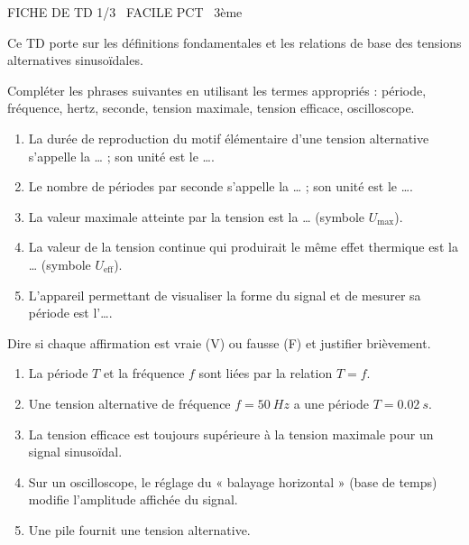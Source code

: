 \documentclass[11pt]{article}
\begin{document}
\begin{tcolorbox}[enhanced,colback=popink,colframe=popink,arc=10pt,boxrule=0pt,left=12pt,right=12pt,top=9pt,bottom=9pt]
{\color{white}\popxbold\small FICHE DE TD 1/3 \textbullet\ FACILE \hfill PCT \textbullet\ 3ème\par}
\end{tcolorbox}
\vspace{4pt}
Ce TD porte sur les définitions fondamentales et les relations de base des tensions alternatives sinusoïdales.

\begin{exercice}
Compléter les phrases suivantes en utilisant les termes appropriés : période, fréquence, hertz, seconde, tension maximale, tension efficace, oscilloscope.
\begin{enumerate}
    \item La durée de reproduction du motif élémentaire d'une tension alternative s'appelle la \ldots{} ; son unité est le \ldots{}.
    \item Le nombre de périodes par seconde s'appelle la \ldots{} ; son unité est le \ldots{}.
    \item La valeur maximale atteinte par la tension est la \ldots{} (symbole $U_{\text{max}}$).
    \item La valeur de la tension continue qui produirait le même effet thermique est la \ldots{} (symbole $U_{\text{eff}}$).
    \item L'appareil permettant de visualiser la forme du signal et de mesurer sa période est l'\ldots{}.
\end{enumerate}
\end{exercice}

\begin{exercice}
Dire si chaque affirmation est vraie (V) ou fausse (F) et justifier brièvement.
\begin{enumerate}
    \item La période $T$ et la fréquence $f$ sont liées par la relation $T = f$.
    \item Une tension alternative de fréquence $f = \SI{50}{Hz}$ a une période $T = \SI{0,02}{s}$.
    \item La tension efficace est toujours supérieure à la tension maximale pour un signal sinusoïdal.
    \item Sur un oscilloscope, le réglage du « balayage horizontal » (base de temps) modifie l'amplitude affichée du signal.
    \item Une pile fournit une tension alternative.
\end{enumerate}
\end{exercice}
\end{document}
